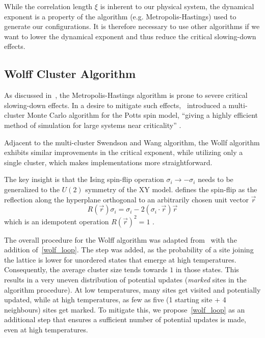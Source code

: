 		While the correlation length $\xi$ is inherent to our physical system, the dynamical exponent is a property of the algorithm (e.g. Metropolis-Hastings) used to generate our configurations. It is therefore necessary to use other algorithms if we want to lower the dynamical exponent and thus reduce the critical slowing-down effects.
		
	\subsection{Wolff Cluster Algorithm}\label{sec:theo:wolff_cluster}
		As discussed in~, the Metropolis-Hastings algorithm is prone to severe critical slowing-down effects. In a desire to mitigate such effects,~\cite{sw} introduced a multi-cluster Monte Carlo algorithm for the Potts spin model, \enquote{giving a highly efficient method of simulation for large systems near criticality} \cite[p. 86]{sw}.
		
		Adjacent to the multi-cluster Swendson and Wang algorithm, the Wollf algorithm exhibits similar improvements in the critical exponent, while utilizing only a single cluster, which makes implementations more straightforward.
		
		The key insight is that the Ising spin-flip operation $\sigma_i \rightarrow -\sigma_i$ needs to be generalized to the $U(2)$ symmetry of the XY model. \cite{wolff} defines the spin-flip as the reflection along the hyperplane orthogonal to an arbitrarily chosen unit vector $\vec{r}$
		\begin{equation}
			R(\vec{r}) \sigma_i = \sigma_i - 2 (\sigma_i \cdot \vec{r}) \vec{r} 
		\end{equation}
		which is an idempotent operation $R(\vec{r})^2=1$ \cite[eq. 3]{wolff}.
	
		The overall procedure for the Wolff algorithm was adapted from~\citet[p. 361]{wolff} with the addition of~\cref{wolf_loop}. The step was added, as the probability of a site joining the lattice is lower for unordered states that emerge at high temperatures. Consequently, the average cluster size tends towards $1$ in those states. This results in a very uneven distribution of potential updates (\emph{marked} sites in the algorithm procedure). At low temperatures, many sites get visited and potentially updated, while at high temperatures, as few as five (1 starting site + 4 neighbours) sites get marked. To mitigate this, we propose~\cref{wolf_loop} as an additional step that ensures a sufficient number of potential updates is made, even at high temperatures.
		
